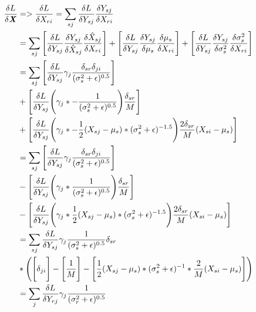 \begin{align*}
    \frac{\delta L}{\delta \textbf{\emph{X}}}
    &=> \frac{\delta L}{\delta X_{ri}}
    = \sum_{sj} \frac{\delta L}{\delta Y_{sj}} \frac{\delta Y_{sj}}{\delta X_{ri}} \\
    &= \sum_{sj} 
    \Bigg[\frac{\delta L}{\delta Y_{sj}} \frac{\delta Y_{sj}}{\delta \hat{X}_{sj}} \frac{\delta \hat{X}_{sj}}{\delta X_{ri}}\Bigg]
    + \Bigg[\frac{\delta L}{\delta Y_{sj}} \frac{\delta Y_{sj}}{\delta \mu_s}  \frac{\delta \mu_s}{\delta X_{ri}}\Bigg]
    + \Bigg[\frac{\delta L}{\delta Y_{sj}}  \frac{\delta Y_{sj}}{\delta \sigma^2_s} \frac{\delta \sigma^2_s}{\delta X_{ri}}\Bigg] \\
    &= \sum_{sj} 
    \Bigg[
        \frac{\delta L}{\delta Y_{sj}} \gamma_j \frac{\delta_{sr}\delta_{ji}}{(\sigma_s^2 + \epsilon)^{0.5}}
    \Bigg] \\
    &+ \Bigg[
        \frac{\delta L}{\delta Y_{sj}} 
        \Bigg( \gamma_j *  - \frac{1}{(\sigma_s^2 + \epsilon)^{0.5}} \Bigg)
        \frac{\delta_{sr}}{M}
    \Bigg] \\
    &+ \Bigg[
        \frac{\delta L}{\delta Y_{sj}} \Bigg(\gamma_j * - \frac{1}{2} (X_{sj} - \mu_s) * (\sigma_s^2 + \epsilon)^{-1.5 } \Bigg)\frac{2 \delta_{sr}}{M} (X_{si} - \mu_s)
    \Bigg] \\
    &= \sum_{sj} 
    \Bigg[
        \frac{\delta L}{\delta Y_{sj}} \gamma_j \frac{\delta_{sr}\delta_{ji}}{(\sigma_s^2 + \epsilon)^{0.5}}
    \Bigg] \\
    &- \Bigg[
        \frac{\delta L}{\delta Y_{sj}} 
        \Bigg( \gamma_j *  \frac{1}{(\sigma_s^2 + \epsilon)^{0.5}} \Bigg)
        \frac{\delta_{sr}}{M}
    \Bigg] \\
    &- \Bigg[
        \frac{\delta L}{\delta Y_{sj}} \Bigg(\gamma_j *  \frac{1}{2} (X_{sj} - \mu_s) * (\sigma_s^2 + \epsilon)^{-1.5 } \Bigg)\frac{2 \delta_{sr}}{M} (X_{si} - \mu_s)
    \Bigg] \\
    &= \sum_{sj} \frac{\delta L}{\delta Y_{sj}} \gamma_j \frac{1}{(\sigma_s^2 + \epsilon)^{0.5}} \delta_{sr} \\
    &* \Bigg(\Bigg[
        \delta_{ji}
    \Bigg] 
    - \Bigg[
        \frac{1}{M}
    \Bigg]
    - \Bigg[
        \frac{1}{2} (X_{sj} - \mu_s) * (\sigma_s^2 + \epsilon)^{-1 } * \frac{2}{M} (X_{si} - \mu_s)
    \Bigg] \Bigg)  \\
    &= \sum_{j} \frac{\delta L}{\delta Y_{rj}} \gamma_j \frac{1}{(\sigma_r^2 + \epsilon)^{0.5}} \\

\end{align*}
